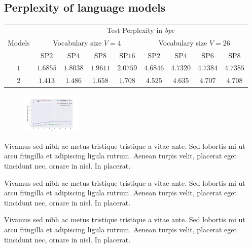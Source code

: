 \documentclass[a0,portrait]{a0poster}
\begin{document}
\begin{multicols}{2}
\subsection*{Perplexity of language models}

\begin{center}
\begin{tabular}{c c c c c | c c c c}
\toprule
\multirow{3}{*}{Models} & \multicolumn{8}{c}{Test Perplexity in \emph{bpc}} \\ \cline{2-9}
	& \multicolumn{4}{c|}{Vocabulary size $V{=}4$} & \multicolumn{4}{c}{Vocabulary size $V{=}26$} \\ \cline{2-9}
    & SP$2$ & SP$4$ & SP$8$ & SP$16$ & SP$2$ & SP$4$ & SP$6$ & SP$8$ \\
\midrule
$1$   & $1.6855$ & $1.8038$ & $1.9611$ & $2.0759$ & $4.6846$ & $4.7320$ & $4.7384$ & $4.7385$ \\
$2$   & $1.413$ & $1.486$ & $1.658$ & $1.708$ & $4.525$ & $4.635$ & $4.707$ & $4.708$ \\
\bottomrule
\end{tabular}
\label{tab:perplexity_score_v4}
\end{center}

\begin{figure}
\begin{center}
\includegraphics[width=0.25\textwidth]{perplexity.png}
\label{fig:perplexity}
\end{center}\vspace{1cm}
\end{figure}

Vivamus sed nibh ac metus tristique tristique a vitae ante. Sed lobortis mi ut arcu fringilla et adipiscing ligula rutrum. Aenean turpis velit, placerat eget tincidunt nec, ornare in nisl. In placerat.

Vivamus sed nibh ac metus tristique tristique a vitae ante. Sed lobortis mi ut arcu fringilla et adipiscing ligula rutrum. Aenean turpis velit, placerat eget tincidunt nec, ornare in nisl. In placerat.

Vivamus sed nibh ac metus tristique tristique a vitae ante. Sed lobortis mi ut arcu fringilla et adipiscing ligula rutrum. Aenean turpis velit, placerat eget tincidunt nec, ornare in nisl. In placerat.


\end{multicols}
\end{document}
